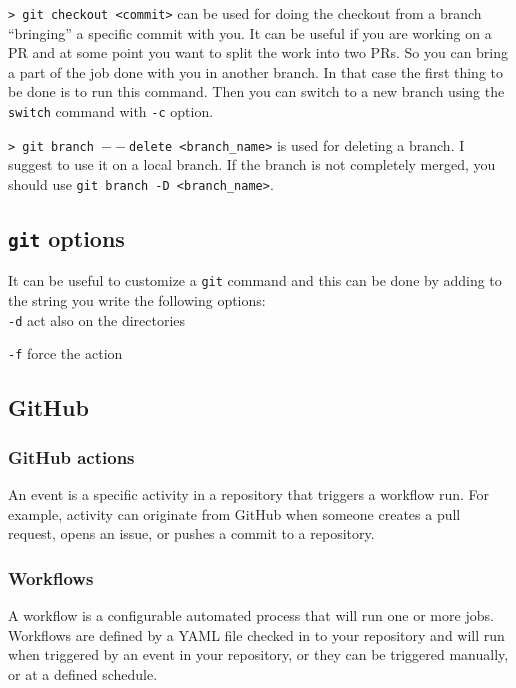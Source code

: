 \documentclass[11pt]{article}
\newcommand{\cmd}[1]{\colorbox{light-gray}{\textcolor{gio}{\texttt{#1}}}}
\begin{document}
\begin{multicols}{2}
\cmd{> git checkout <commit>} can be used for doing the checkout from a branch 
``bringing'' a specific commit with you. It can be useful if you are working on a
PR and at some point you want to split the work into two PRs. So you can bring a 
part of the job done with you in another branch. In that case the first thing to 
be done is to run this command. Then you can switch to a new branch using the 
\texttt{switch} command with \texttt{-c} option. 

\cmd{> git branch $--$delete <branch\_name>} is used for deleting a branch. I 
suggest to use it on a local branch. If the branch is not completely merged, 
you should use \texttt{git branch -D <branch\_name>}.



\subsection{\texttt{git} options}

It can be useful to customize a \texttt{git} command and this can be done by adding 
to the string you write the following options: \\

\cmd{-d} act also on the directories

\cmd{-f} force the action

\subsection{GitHub}

\subsubsection{GitHub actions}

An event is a specific activity in a repository that triggers a workflow run. 
For example, activity can originate from GitHub when someone creates a pull request, 
opens an issue, or pushes a commit to a repository.

\subsubsection{Workflows}

A workflow is a configurable automated process that will run one or more jobs. 
Workflows are defined by a YAML file checked in to your repository and will run 
when triggered by an event in your repository, or they can be triggered manually, 
or at a defined schedule. \\


\end{multicols}
\end{document}
